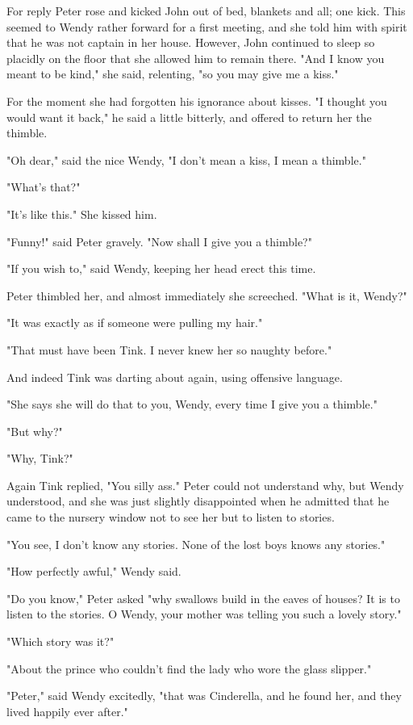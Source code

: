 For reply Peter rose and kicked John out of bed, blankets and all; one
kick. This seemed to Wendy rather forward for a first meeting, and she
told him with spirit that he was not captain in her house. However, John
continued to sleep so placidly on the floor that she allowed him to remain
there. "And I know you meant to be kind," she said, relenting, "so you may
give me a kiss."


For the moment she had forgotten his ignorance about kisses. "I thought
you would want it back," he said a little bitterly, and offered to return
her the thimble.


"Oh dear," said the nice Wendy, "I don't mean a kiss, I mean a thimble."


"What's that?"


"It's like this." She kissed him.


"Funny!" said Peter gravely. "Now shall I give you a thimble?"


"If you wish to," said Wendy, keeping her head erect this time.


Peter thimbled her, and almost immediately she screeched. "What is it,
Wendy?"


"It was exactly as if someone were pulling my hair."


"That must have been Tink. I never knew her so naughty before."


And indeed Tink was darting about again, using offensive language.


"She says she will do that to you, Wendy, every time I give you a
thimble."


"But why?"


"Why, Tink?"


Again Tink replied, "You silly ass." Peter could not understand why, but
Wendy understood, and she was just slightly disappointed when he admitted
that he came to the nursery window not to see her but to listen to
stories.


"You see, I don't know any stories. None of the lost boys knows any
stories."


"How perfectly awful," Wendy said.


"Do you know," Peter asked "why swallows build in the eaves of houses? It
is to listen to the stories. O Wendy, your mother was telling you such a
lovely story."


"Which story was it?"


"About the prince who couldn't find the lady who wore the glass slipper."


"Peter," said Wendy excitedly, "that was Cinderella, and he found her, and
they lived happily ever after."


